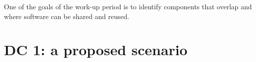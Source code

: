 \documentclass[pdftex,12pt,letter]{article}
\begin{document}
\noindent  One of the goals of the work-up period is to identify components that overlap and where software can be shared and reused. 


\clearpage

\section{DC 1: a proposed scenario}
\end{document}

